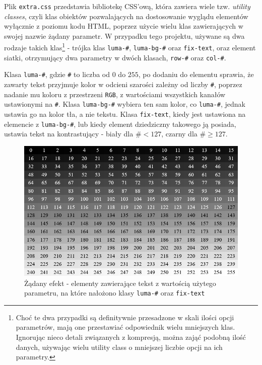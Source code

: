 \documentclass[licencjacka]{pracadypl}
\begin{document}
Plik \texttt{extra.css} przedstawia bibliotekę CSS'ową, która zawiera wiele tzw. \emph{utility classes}, czyli klas obiektów pozwalających na dostosowanie wyglądu elementów wyłącznie z poziomu kodu HTML, poprzez użycie wielu klas zawierających w swojej nazwie żądany parametr. W przypadku tego projektu, używane są dwa rodzaje takich klas\footnote{Choć te dwa przypadki są definitywnie przesadzone w skali ilości opcji parametrów, mają one przestawiać odpowiednik wielu mniejszych klas. Ignorując nieco detali związanych z kompresją, można zająć podobną ilość danych, używając wielu utility class o mniejszej liczbie opcji na ich parametry.} - trójka klas \texttt{luma-\#}, \texttt{luma-bg-\#} oraz \texttt{fix-text}, oraz element siatki, otrzymujący dwa parametry w dwóch klasach, \texttt{row-\#} oraz \texttt{col-\#}.

Klasa \texttt{luma-\#}, gdzie \texttt{\#} to liczba od $0$ do $255$, po dodaniu do elementu sprawia, że zawarty tekst przyjmuje kolor w odcieni szarości zależny od liczby \texttt{\#}, poprzez nadanie mu koloru z przestrzeni \texttt{RGB}, z wartościami wszystkich kanałów ustawionymi na \texttt{\#}. Klasa \texttt{luma-bg-\#} wybiera ten sam kolor, co \texttt{luma-\#}, jednak ustawia go na kolor tła, a nie tekstu. Klasa \texttt{fix-text}, kiedy jest ustawiona na elemencie z \texttt{luma-bg-\#}, lub kiedy element dziedziczny takowego ją posiada, ustawia tekst na kontrastujący - biały dla $\texttt{\#} < 127$, czarny dla $\texttt{\#} \geq 127$.

\begin{figure}[H]
  \centering
  \includegraphics[width=\linewidth]{images/ui-luma-grid.png}
  \caption{Żądany efekt - elementy zawierające tekst z wartością użytego parametru, na które nałożono klasy \texttt{luma-\#} oraz \texttt{fix-text}}
  \label{fig:ui-luma-grid}
\end{figure}
\end{document}
